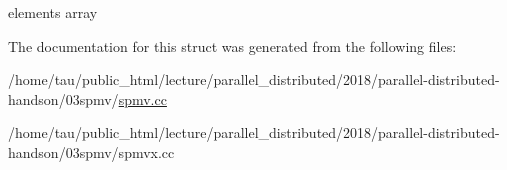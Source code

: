 elements array 

The documentation for this struct was generated from the following files\+:\begin{DoxyCompactItemize}
\item 
/home/tau/public\+\_\+html/lecture/parallel\+\_\+distributed/2018/parallel-\/distributed-\/handson/03spmv/\hyperlink{spmv_8cc}{spmv.\+cc}\item 
/home/tau/public\+\_\+html/lecture/parallel\+\_\+distributed/2018/parallel-\/distributed-\/handson/03spmv/spmvx.\+cc\end{DoxyCompactItemize}
